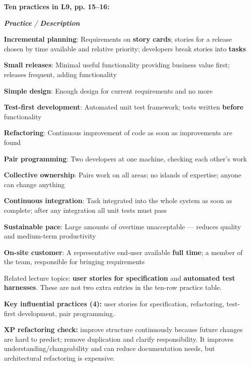 \begin{studycolumns}
\textbf{Ten practices in L9, pp. 15--16:}


\begin{referenceentries}
\textit{\textbf{Practice} / \textbf{Description}}\par\smallskip
\noindent \textbf{\textbf{Incremental planning}}: Requirements on \textbf{story cards}; stories for a release chosen by time available and relative priority; developers break stories into \textbf{tasks}\par
\noindent \textbf{\textbf{Small releases}}: Minimal useful functionality providing business value first; releases frequent, adding functionality\par
\noindent \textbf{\textbf{Simple design}}: Enough design for current requirements and no more\par
\noindent \textbf{\textbf{Test-first development}}: Automated unit test framework; tests written \textbf{before} functionality\par
\noindent \textbf{\textbf{Refactoring}}: Continuous improvement of code as soon as improvements are found\par
\noindent \textbf{\textbf{Pair programming}}: Two developers at one machine, checking each other's work\par
\noindent \textbf{\textbf{Collective ownership}}: Pairs work on all areas; no islands of expertise; anyone can change anything\par
\noindent \textbf{\textbf{Continuous integration}}: Task integrated into the whole system as soon as complete; after any integration all unit tests must pass\par
\noindent \textbf{\textbf{Sustainable pace}}: Large amounts of overtime unacceptable --- reduces quality and medium-term productivity\par
\noindent \textbf{\textbf{On-site customer}}: A representative end-user available \textbf{full time}; a member of the team, responsible for bringing requirements\par
\end{referenceentries}
Related lecture topics: \textbf{user stories for specification} and \textbf{automated test harnesses}. These are not two extra entries in the ten-row practice table.

\textbf{Key influential practices (4):} user stories for specification, refactoring, test-first development, pair programming.

\textbf{XP refactoring check:} improve structure continuously because future changes are hard to predict; remove duplication and clarify responsibility. It improves understanding/\allowbreak{}changeability and can reduce documentation needs, but architectural refactoring is expensive.


\end{studycolumns}
